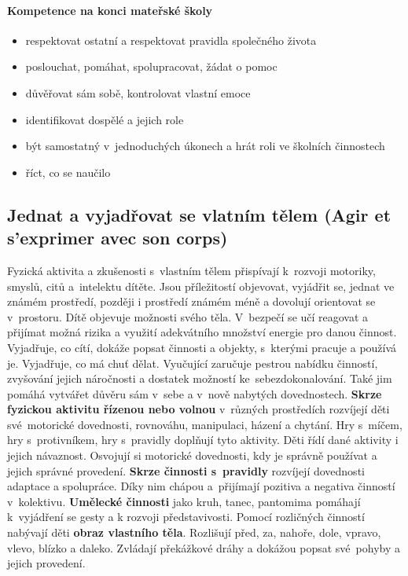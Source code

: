 			\paragraph{Kompetence na konci mateřské školy}
			\begin{itemize}
				\item respektovat ostatní a respektovat pravidla společného života
				\item poslouchat, pomáhat, spolupracovat, žádat o pomoc
				\item důvěřovat sám sobě, kontrolovat vlastní emoce
				\item identifikovat dospělé a jejich role
				\item být samostatný v jednoduchých úkonech a hrát roli ve školních činnostech
				\item říct, co se naučilo
				\end{itemize}

		\subsection{Jednat a vyjadřovat se vlatním tělem (Agir et s'exprimer avec son corps)}
			Fyzická aktivita a zkušenosti s vlastním tělem přispívají k rozvoji motoriky, smyslů, citů a intelektu dítěte. Jsou příležitostí objevovat, vyjádřit se, jednat ve známém prostředí, později i prostředí známém méně a dovolují orientovat se v prostoru. Dítě objevuje možnosti svého těla. V bezpečí se učí reagovat a přijímat možná rizika a využití adekvátního množství energie pro danou činnost. Vyjadřuje, co cítí, dokáže popsat činnosti a objekty, s kterými pracuje a používá je. Vyjadřuje, co má chuť dělat. Vyučující zaručuje  pestrou nabídku činností, zvyšování jejich náročnosti a dostatek možností ke sebezdokonalování. Také jim pomáhá vytvářet důvěru sám v sebe a v nově nabytých dovednostech. 
			\textbf{Skrze fyzickou aktivitu řízenou nebo volnou} v různých prostředích rozvíjejí děti své motorické dovednosti, rovnováhu, manipulaci, házení a chytání. Hry s míčem, hry s protivníkem, hry s pravidly doplňují tyto aktivity. Děti řídí dané aktivity i jejich návaznost. Osvojují si motorické dovednosti, kdy je správně používat a jejich správné provedení. 
			\textbf{Skrze činnosti s pravidly} rozvíjejí dovednosti adaptace a spolupráce. Díky nim chápou a přijímají pozitiva a negativa činností v kolektivu. 
			\textbf{Umělecké činnosti} jako kruh, tanec, pantomima pomáhají k vyjádření se gesty a k rozvoji představivosti.
			Pomocí rozličných činností nabývají děti \textbf{obraz vlastního těla}. Rozlišují před, za, nahoře, dole, vpravo, vlevo, blízko a daleko. Zvládají překážkové dráhy a dokážou popsat své pohyby a jejich provedení.
